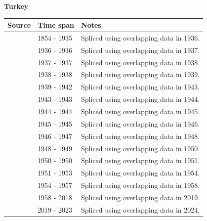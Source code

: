 \documentclass[12pt,a4paper,landscape]{article}
\begin{document}
\begin{adjustbox}{max totalsize={\paperwidth}{\paperheight},center}
\begin{minipage}[t][\textheight][t]{\textwidth}
\vspace*{0.5cm}
{}
\begin{center}
{\Large\bfseries Turkey}
\end{center}
\vspace{0.5cm}
\begin{table}[H]
\centering
\small
\begin{tabular}{|l|l|l|}
\hline
\textbf{Source} & \textbf{Time span} & \textbf{Notes} \\
\hline
\rowcolor{white}\cite{RR_debt}& 1854 - 1935 &Spliced using overlapping data in 1936.\\
\rowcolor{lightgray}\cite{IMF_FPP}& 1936 - 1936 &Spliced using overlapping data in 1937.\\
\rowcolor{white}\cite{RR_debt}& 1937 - 1937 &Spliced using overlapping data in 1938.\\
\rowcolor{lightgray}\cite{IMF_FPP}& 1938 - 1938 &Spliced using overlapping data in 1939.\\
\rowcolor{white}\cite{RR_debt}& 1939 - 1942 &Spliced using overlapping data in 1943.\\
\rowcolor{lightgray}\cite{IMF_FPP}& 1943 - 1943 &Spliced using overlapping data in 1944.\\
\rowcolor{white}\cite{RR_debt}& 1944 - 1944 &Spliced using overlapping data in 1945.\\
\rowcolor{lightgray}\cite{IMF_FPP}& 1945 - 1945 &Spliced using overlapping data in 1946.\\
\rowcolor{white}\cite{RR_debt}& 1946 - 1947 &Spliced using overlapping data in 1948.\\
\rowcolor{lightgray}\cite{IMF_FPP}& 1948 - 1949 &Spliced using overlapping data in 1950.\\
\rowcolor{white}\cite{IMF_GDD}& 1950 - 1950 &Spliced using overlapping data in 1951.\\
\rowcolor{lightgray}\cite{RR_debt}& 1951 - 1953 &Spliced using overlapping data in 1954.\\
\rowcolor{white}\cite{IMF_FPP}& 1954 - 1957 &Spliced using overlapping data in 1958.\\
\rowcolor{lightgray}\cite{IMF_GDD}& 1958 - 2018 &Spliced using overlapping data in 2019.\\
\rowcolor{white}\cite{IMF_FPP}& 2019 - 2023 &Spliced using overlapping data in 2024.\\

\end{tabular}
\end{table}
\end{minipage}
\end{adjustbox}
\end{document}
